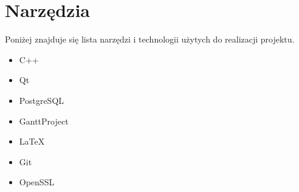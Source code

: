 \chapter{Narzędzia}
\label{ap:3}

Poniżej znajduje się lista narzędzi i technologii użytych do realizacji projektu.

\begin{itemize}

\item C++
\item Qt
\item PostgreSQL
\item GanttProject
\item \LaTeX
\item Git
\item OpenSSL

\end{itemize}